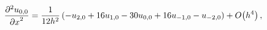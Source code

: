 \[\frac{{\partial}^{2}u_{0,0}}{{\partial x}^{2}}=\frac{1}{12h^{2}}\,(-u_{2,0}+16%
u_{1,0}-30u_{0,0}+16u_{-1,0}-u_{-2,0})+\mathop{O\/}\nolimits\!\left(h^{4}%
\right),\]